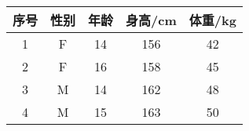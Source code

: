 \begin{tabular}{ccccc}
  \toprule
  序号 & 性别 & 年龄 & 身高/cm & 体重/kg \\
  \midrule
  1 & F & 14 & 156 & 42 \\
  2 & F & 16 & 158 & 45 \\
  3 & M & 14 & 162 & 48 \\
  4 & M & 15 & 163 & 50 \\
  \bottomrule
\end{tabular}
